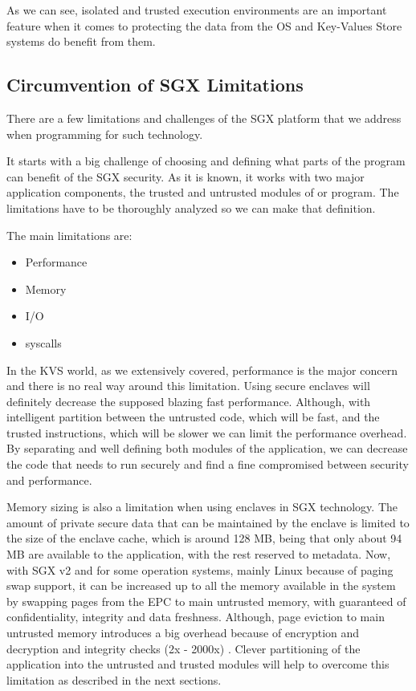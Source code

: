 As we can see, isolated and trusted execution environments are an important feature when it comes to protecting the data from the \gls{OS} and Key-Values Store systems do benefit from them.

\subsection{Circumvention of SGX Limitations}
\label{ssec:circumvention_of_sgx_limitations}

There are a few limitations and challenges of the SGX platform that we address when programming for such technology.

It starts with a big challenge of choosing and defining what parts of the program can benefit of the \gls{SGX} security. As it is known, it works with two major application components, the trusted and untrusted modules of or program. The limitations have to be thoroughly analyzed so we can make that definition.  

The main limitations are: 

\begin{itemize}
	\item Performance
	\item Memory
	\item \gls{I/O}
	\item \gls{syscall}s
\end{itemize}

In the \gls{KVS} world, as we extensively covered, performance is the major concern and there is no real way around this limitation. Using secure enclaves will definitely decrease the supposed blazing fast performance. Although, with intelligent partition between the untrusted code, which will be fast, and the trusted instructions, which will be slower we can limit the performance overhead. By separating and well defining both modules of the application, we can decrease the code that needs to run securely and find a fine compromised between security and performance.

Memory sizing is also a limitation when using enclaves in \gls{SGX} technology. The amount of private secure data that can be maintained by the enclave is limited to the size of the enclave cache, which is around 128 \gls{MB}, being that only about 94 \gls{MB} are available to the application, with the rest reserved to metadata. Now, with \gls{SGX} v2 and for some operation systems, mainly Linux because of paging swap support, it can be increased up to all the memory available in the system \cite{sgx:1} by swapping pages from the \gls{EPC} to main untrusted memory, with guaranteed of confidentiality, integrity and data freshness. Although, page eviction to main untrusted memory introduces a big overhead because of encryption and decryption and integrity checks (2x - 2000x) \cite{scone:1}. Clever partitioning of the application into the untrusted and trusted modules will help to overcome this limitation as described in the next sections.

